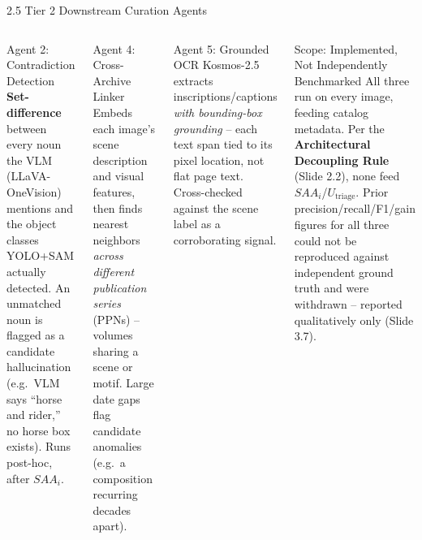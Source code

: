 \documentclass[aspectratio=169,11pt]{beamer}
\begin{document}
\begin{frame}{2.5 Tier 2 Downstream Curation Agents}
\scriptsize
\begin{columns}[T]
\begin{block}{Agent 2: Contradiction Detection}
\textbf{Set-difference} between every noun the VLM (LLaVA-OneVision) mentions and the object classes YOLO+SAM actually detected. An unmatched noun is flagged as a candidate hallucination (e.g.\ VLM says ``horse and rider,'' no horse box exists). Runs post-hoc, after $SAA_i$.
\end{block}
\begin{block}{Agent 4: Cross-Archive Linker}
Embeds each image's scene description and visual features, then finds nearest neighbors \emph{across different publication series} (PPNs) -- volumes sharing a scene or motif. Large date gaps flag candidate anomalies (e.g.\ a composition recurring decades apart).
\end{block}

\begin{block}{Agent 5: Grounded OCR}
Kosmos-2.5 extracts inscriptions/captions \emph{with bounding-box grounding} -- each text span tied to its pixel location, not flat page text. Cross-checked against the scene label as a corroborating signal.
\end{block}
\begin{block}{Scope: Implemented, Not Independently Benchmarked}
All three run on every image, feeding catalog metadata. Per the \textbf{Architectural Decoupling Rule} (Slide 2.2), none feed $SAA_i$/$U_{\text{triage}}$. Prior precision/recall/F1/gain figures for all three could not be reproduced against independent ground truth and were withdrawn -- reported qualitatively only (Slide 3.7).
\end{block}
\end{columns}
\end{frame}
\end{document}
